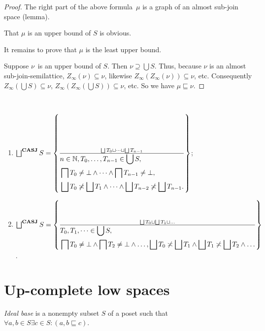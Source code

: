 \begin{proof}
The right part of the above formula~$\mu$ is a graph of an almost sub-join space (lemma).

That $\mu$ is an upper bound of $S$ is obvious.

It remains to prove that $\mu$ is the least upper bound.

Suppose $\nu$~is an upper bound of $S$. Then $\nu\supseteq\bigcup S$. Thus, because $\nu$ is an almost sub-join-semilattice,
$Z_{\infty}(\nu)\subseteq\nu$, likewise $Z_{\infty}(Z_{\infty}(\nu))\subseteq\nu$, etc. Consequently $Z_{\infty}(\bigcup S)\subseteq\nu$, $Z_{\infty}(Z_{\infty}(\bigcup S))\subseteq\nu$, etc.
So we have $\mu\sqsubseteq\nu$.
\end{proof}

\begin{conjecture}
~
\begin{enumerate}
\item $\bigsqcup^{\mathbf{CASJ}}S=
\setcond{\bigsqcup T_0\sqcup\dots\sqcup\bigsqcup T_{n-1}}{
\begin{aligned}
&n\in\mathbb{N},T_0,\dots,T_{n-1}\in\bigcup S, \\
&\bigsqcap T_0\ne\bot\land\dots\land\bigsqcap T_{n-1}\ne\bot, \\
&\bigsqcup T_0\nasymp\bigsqcup T_1\land\dots\land\bigsqcup T_{n-2}\nasymp\bigsqcup T_{n-1}.
\end{aligned}}$;

\item $\bigsqcup^{\mathbf{CASJ}}S=
\setcond{\bigsqcup T_0\sqcup \bigsqcup T_1\sqcup\dots}{
\begin{aligned}
&T_0,T_1,\dots\in\bigcup S, \\
&\bigsqcap T_0\ne\bot\land\bigsqcap T_2\ne\bot\land\dots,
\bigsqcup T_0\nasymp\bigsqcup T_1\land\bigsqcup T_1\nasymp\bigsqcup T_2\land\dots
\end{aligned}}$.
\end{enumerate}
\end{conjecture}

\section{Up-complete low spaces}

\begin{defn}
  \emph{Ideal base} is a nonempty subset $S$ of a poset such that $\forall
  a, b \in S \exists c \in S : (a, b \sqsubseteq c)$.
\end{defn}

